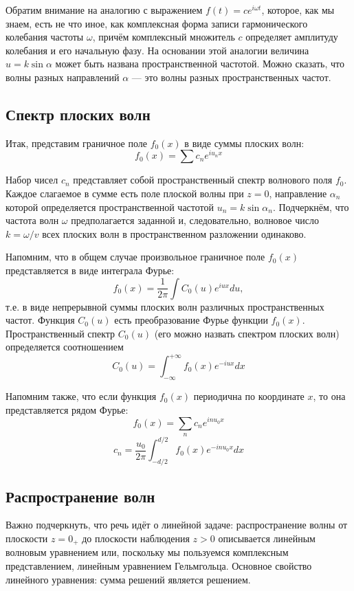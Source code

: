 Обратим внимание на аналогию с выражением $f(t) = ce^{i\omega t}$, которое, как мы знаем, есть не что иное, как комплексная форма записи гармонического колебания частоты $\omega$, причём комплексный множитель $c$ определяет амплитуду колебания и его начальную фазу. На основании этой аналогии величина $u=k\sin\alpha$  может быть названа пространственной частотой. Можно сказать, что волны разных направлений $\alpha$ --- это волны разных пространственных частот.

\subsection{Спектр плоских волн}
Итак, представим граничное поле $f_0(x)$ в виде суммы плоских волн:
\[
f_0(x) = \sum c_n e^{iu_nx}
\]

Набор чисел $c_n$ представляет собой пространственный спектр волнового поля $f_0$.  Каждое слагаемое в сумме есть поле плоской волны при $z=0$, направление $\alpha_n$ которой определяется пространственной частотой $u_n = k\sin\alpha_n$.  Подчеркнём, что частота волн $\omega$ предполагается заданной и, следовательно, волновое число$k = \omega / v$ всех плоских волн в пространственном разложении одинаково.

Напомним, что в общем случае произвольное граничное поле $f_0(x)$ представляется в виде интеграла Фурье:
\[
f_0(x) = \frac{1}{2\pi}\int C_0 (u) e^{iux} du,
\]
т.е. в виде непрерывной суммы плоских волн различных пространственных частот. Функция $C_0(u)$ есть преобразование Фурье функции $f_0(x)$. Пространственный спектр $C_0(u)$ (его можно назвать спектром плоских волн) определяется соотношением
\[
    C_0(u) = \int_{-\infty}^{+\infty} f_0(x)e^{-iux}dx
\]

Напомним также, что если функция $f_0(x)$ периодична по координате $x$, то она представляется рядом Фурье:
\[
    f_0(x) = \sum_n c_n e^{inu_0x}
\]
\[
    c_n = \frac{u_0}{2\pi}\int_{-d/2}^{d/2} f_0(x)e^{-inu_0x}dx
\]

\subsection{Распространение волн}
Важно подчеркнуть, что речь идёт о линейной задаче: распространение волны от плоскости $z=0_+$  до плоскости наблюдения $z > 0$ описывается линейным волновым уравнением  или, поскольку мы пользуемся комплексным представлением, линейным уравнением Гельмгольца. Основное свойство линейного уравнения: сумма решений является решением.

